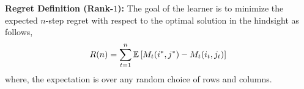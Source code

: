 \textbf{Regret Definition (Rank-$1$):} The goal of the learner is to minimize the expected $n$-step regret with respect to the optimal solution in the hindsight as follows,
\begin{align}
  R(n) =
  \sum_{t = 1}^n \mathbb{E}\left[M_t(i^\ast, j^\ast) - M_t(i_t,j_t)\right]\,
  \label{eq:regret}
\end{align}
where, the expectation is over any random choice of rows and columns. 








